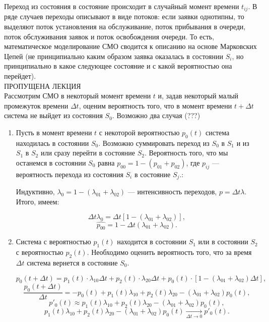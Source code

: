 \documentclass[12pt]{article}
\begin{document}
Переход из состояния в состояние происходит в случайный момент времени $t_{ij}$. В ряде случаев переходы описывают в виде потоков: если заявки однотипны, то выделяют поток установления на обслуживание, поток прибывания в очереди, поток обслуживания заявок и поток освобождения очереди. То есть, математическое моделирование СМО сводится к описанию на основе Марковских Цепей (не принципиально каким образом заявка оказалась в состоянии $S_i$, но принципиально в какое следующее состояние и с какой вероятностью она перейдет).\\

ПРОПУЩЕНА ЛЕКЦИЯ\\

Рассмотрим СМО в некоторый момент времени $t$ и, задав некоторый малый промежуток времени $\Delta t$, оценим вероятность того, что в момент времени $t + \Delta t$ система не выйдет из состояния $S_0$. Возможно два случая (???)

\begin{enumerate}
    \item Пусть в момент времени $t$ с некоторой вероятностью $p_0(t)$ система находилась в состоянии $S_0$. Возможно суммировать переход из $S_0$ в $S_1$ и из $S_1$ в $S_2$ или сразу перейти в состояние $S_2$. Вероятность того, что мы останемся в состоянии $S_0$ равна $p_{00} = 1 - (p_{01} + p_{02})$, где $p_{ij}$ --- вероятность перехода из состояния $S_i$ в состояние $S_j$.:
    
    Индуктивно, $\lambda_0 = 1 - (\lambda_{01} + \lambda_{02})$ --- интенсивность переходов, $p = \Delta t \lambda$. Итого, имеем:

    \[ \Delta t \lambda_0 = \Delta t \left[1 - (\lambda_{01} + \lambda_{02}) \right], \]
    \[ \hat{p_{00}} = 1 - \Delta t (\lambda_{01} + \lambda_{02}). \]

    \item Система с вероятностью $p_1(t)$ находится в состоянии $S_1$ или в состоянии $S_2$ с вероятностью $p_2(t)$. Необходимо оценить вероятность того, что за время $\Delta t$ система вернется в состояние $S_0$.
    
    \[ p_0 (t + \Delta t) = p_1 (t) \cdot \lambda_{10} \Delta t + p_2 (t) \cdot \lambda_{20} \Delta t + p_0 (t) \cdot [ 1 - (\lambda_{01} + \lambda_{02}) \Delta t],\]
    \[ \frac{p_0 (t + \Delta t)}{\Delta t} = - p_0 (t) + p_1(t) \lambda_{10} + p_2(t) \lambda_{20} - (\lambda_{01} + \lambda_{02}) p_0(t), \]
    \[ p'_0(t) \approx p_1 (t) \lambda_{10} + p_2 (t) \lambda_{20} - (\lambda_{01} + \lambda_{02}) p_0 (t),\]
    \[ p_1 (t) \lambda_{10} + p_2 (t) \lambda_{20} - (\lambda_{01} + \lambda_{02}) p_0 (t) \underset{\Delta t \to 0}{\to}  p'_0(t). \]
\end{enumerate}
\end{document}
